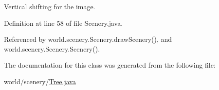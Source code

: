 Vertical shifting for the image. 



Definition at line 58 of file Scenery.\-java.



Referenced by world.\-scenery.\-Scenery.\-draw\-Scenery(), and world.\-scenery.\-Scenery.\-Scenery().



The documentation for this class was generated from the following file\-:\begin{DoxyCompactItemize}
\item 
world/scenery/\hyperlink{_tree_8java}{Tree.\-java}\end{DoxyCompactItemize}
